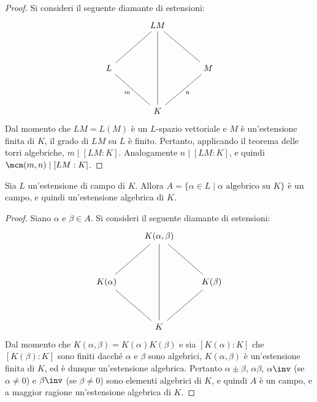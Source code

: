 \documentclass[12pt]{scrartcl}
\begin{document}
	\begin{proof}
		Si consideri il seguente diamante di estensioni:
		\[\begin{tikzcd}[column sep=scriptsize]
			&& LM \\
			\\
			L &&&& M \\
			\\
			&& K
			\arrow["n", no head, from=3-5, to=5-3]
			\arrow["m"', no head, from=3-1, to=5-3]
			\arrow[no head, from=1-3, to=3-5]
			\arrow[no head, from=1-3, to=3-1]
			\arrow[no head, from=1-3, to=5-3]
		\end{tikzcd}\]
		Dal momento che $LM = L(M)$ è un $L$-spazio vettoriale
		e $M$ è un'estensione finita di $K$, il grado di $LM$
		su $L$ è finito. Pertanto, applicando il teorema delle
		torri algebriche, $m \mid [LM : K]$. Analogamente
		$n \mid [LM : K]$, e quindi $\mcm(m, n) \mid [LM : K]$.
	\end{proof}

	\begin{proposition}
		Sia $L$ un'estensione di campo di $K$. Allora
		$A = \{ \alpha \in L \mid \alpha \text{ algebrico su } K \}$ è un campo, e quindi un'estensione algebrica
		di $K$.
	\end{proposition}

	\begin{proof}
		Siano $\alpha$ e $\beta \in A$. Si consideri il
		seguente diamante di estensioni:
		\[\begin{tikzcd}[column sep=small]
			&& {K(\alpha, \beta)} \\
			\\
			{K(\alpha)} &&&& {K(\beta)} \\
			\\
			&& K
			\arrow[no head, from=3-5, to=5-3]
			\arrow[no head, from=3-1, to=5-3]
			\arrow[no head, from=1-3, to=3-5]
			\arrow[no head, from=1-3, to=3-1]
			\arrow[no head, from=1-3, to=5-3]
		\end{tikzcd}\]
		Dal momento che $K(\alpha, \beta) = K(\alpha)K(\beta)$
		e sia $[K(\alpha) : K]$ che $[K(\beta) : K]$ sono
		finiti dacché $\alpha$ e $\beta$ sono algebrici,
		$K(\alpha, \beta)$ è un'estensione finita di $K$,
		ed è dunque un'estensione algebrica. Pertanto
		$\alpha \pm \beta$, $\alpha\beta$, $\alpha\inv$
		(se $\alpha \neq 0$) e $\beta\inv$ (se $\beta \neq 0$) sono elementi algebrici di $K$,
		e quindi $A$ è un campo, e a maggior ragione un'estensione algebrica di $K$.
	\end{proof}
\end{document}
